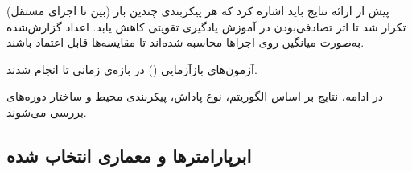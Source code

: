 \documentclass[12pt, a4paper]{report}
\begin{document}
\vspace{0.75cm}

پیش از ارائه نتایج باید اشاره کرد که هر پیکربندی چندین بار (بین  تا  اجرای مستقل) تکرار شد  
تا اثر تصادفی‌بودن در آموزش یادگیری تقویتی کاهش یابد.  
اعداد گزارش‌شده به‌صورت میانگین روی اجراها محاسبه شده‌اند تا مقایسه‌ها قابل اعتماد باشند.  

آزمون‌های بازآزمایی () در بازه‌ی زمانی  
 تا  انجام شدند.  

در ادامه، نتایج بر اساس الگوریتم، نوع پاداش، پیکربندی محیط و ساختار دوره‌‌های بررسی می‌شوند.  


\subsection{ابرپارامترها و معماری انتخاب شده}
\end{document}
